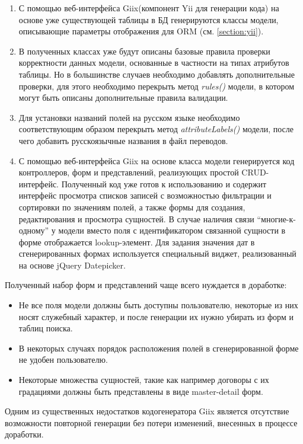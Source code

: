 \begin{enumerate}
\item{
  С помощью веб-интерфейса Giix(компонент Yii для генерации кода) на основе уже существующей таблицы 
в БД генерируются классы модели, описывающие параметры отображения для ORM (см. \ref{section:yii}).
}
\item{
  В полученных классах уже будут описаны базовые правила проверки корректности данных модели,
основанные в частности на типах атрибутов таблицы. Но в большинстве случаев необходимо добавлять
дополнительные проверки, для этого необходимо перекрыть метод \textit{rules()} модели, в котором
могут быть описаны дополнительные правила валидации.
}
\item{
  Для установки названий полей на русском языке необходимо 
соответствующим образом перекрыть метод \textit{attributeLabels()} модели, после чего добавить
русскоязычные названия в файл переводов. 
}
\item{
 С помощью веб-интерфейса Giix на основе класса модели генерируется код контроллеров, форм
и представлений, реализующих простой CRUD-интерфейс.
Полученный код уже готов к использованию и содержит интерфейс просмотра списков записей 
с возможностью фильтрации и сортировки по значениям полей, а также формы для создания,
редактирования и просмотра сущностей. В случае наличия связи ``многие-к-одному'' у модели 
вместо поля с идентификатором связанной сущности в форме отображается lookup-элемент.
Для задания значения дат в сгенерированных формах используется специальный виджет,
реализованный на основе jQuery Datepicker.
}
\end{enumerate}

Полученный набор форм и представлений чаще всего нуждается в доработке: 
\begin{itemize}
\item{
Не все поля модели должны быть доступны пользователю, некоторые из них носят служебный характер,
и после генерации их нужно убирать из форм и таблиц поиска.
}
\item{
В некоторых случаях порядок расположения полей в сгенерированной форме не удобен
пользователю.
}
\item{
Некоторые множества сущностей, такие как например договоры с их градациями должны быть представлены
в виде master-detail форм.  
}
\end{itemize}

Одним из существенных недостатков кодогенератора Giix является отсутствие возможности повторной генерации
без потери изменений, внесенных в процессе доработки.
